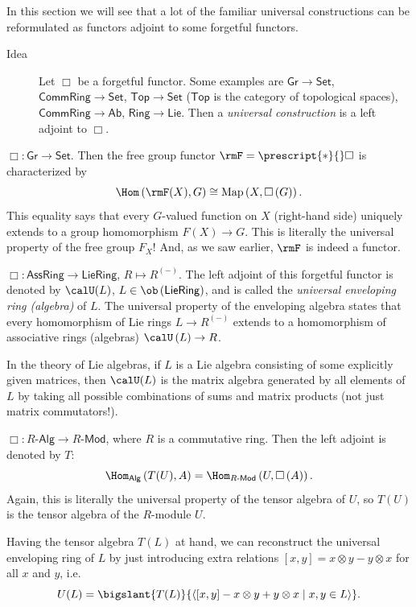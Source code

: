 In this section we will see that a lot of the familiar universal constructions
can be reformulated as functors adjoint to some forgetful functors. 
\begin{description}
\item [{Idea}] Let $\Box$ be a forgetful functor. Some examples are $\mathsf{Gr}\to\mathsf{Set}$,
$\mathsf{CommRing}\to\mathsf{Set}$, $\mathsf{Top}\to\mathsf{Set}$
($\mathsf{Top}$ is the category of topological spaces), $\mathsf{CommRing}\to\mathsf{Ab}$,
$\mathsf{Ring}\to\mathsf{Lie}$. Then a \emph{universal construction}
is a left adjoint to $\Box$.
\end{description}
\begin{example}
$\Box:\mathsf{Gr}\to\mathsf{Set}$. Then the free group functor $\rmF=\prescript{\ast}{}\Box$ is characterized
by 
\[
\Hom\left(\rmF(X),G\right)\cong\mathrm{Map}\left(X,\Box\left(G\right)\right).
\]
This equality says that every $G$-valued function on $X$ (right-hand
side) uniquely extends to a group homomorphism $F(X)\to G$. This
is literally the universal property of the free group $F_{X}$! And, as we saw earlier, $\rmF$ is indeed a functor.
\end{example}
%
\begin{example}
$\Box:\mathsf{AssRing}\to\mathsf{LieRing}$, $R\mapsto R^{(-)}$.
The left adjoint of this forgetful functor is denoted by $\calU(L)$,
$L\in\ob\left(\mathsf{LieRing}\right)$, and is called the \emph{universal
enveloping ring (algebra)} of $L$. The universal property of the
enveloping algebra states that every homomorphism of Lie rings $L\to R^{(-)}$
extends to a homomorphism of associative rings (algebras) $\calU\left(L\right)\to R$. 

In the theory of Lie algebras, if $L$ is a Lie algebra consisting
of some explicitly given matrices, then $\calU(L)$ is the matrix algebra
generated by all elements of $L$ by taking all possible combinations
of sums and matrix products (not just matrix commutators!).
\end{example}
%
\begin{example}
$\Box:R\text{-}\mathsf{Alg}\to R\text{-}\mathsf{Mod}$, where $R$
is a commutative ring. Then the left adjoint is denoted by $T$:
\[
\Hom_{\mathsf{Alg}}\left(T(U),A\right)=\Hom_{R\text{-}\mathsf{Mod}}\left(U,\Box\left(A\right)\right).
\]
Again, this is literally the universal property of the tensor algebra
of $U$, so $T(U)$ is the tensor algebra of the $R$-module $U$.

Having the tensor algebra $T(L)$ at hand, we can reconstruct the
universal enveloping ring of $L$ by just introducing extra relations
$\left[x,y\right]=x\otimes y-y\otimes x$ for all $x$ and $y$, i.e.
\[
U(L)=\bigslant{T(L)}{\left\langle [x,y]-x\otimes y+y\otimes x\mid x,y\in L\right\rangle }.
\]
\end{example}

